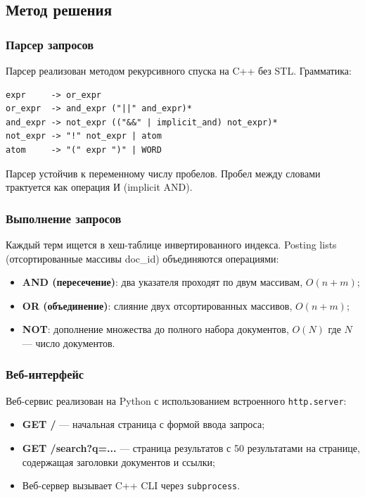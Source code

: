\documentclass[a4paper,12pt]{article}
\begin{document}
\subsection{Метод решения}

\subsubsection{Парсер запросов}

Парсер реализован методом рекурсивного спуска на C++ без STL. Грамматика:

\begin{lstlisting}
expr     -> or_expr
or_expr  -> and_expr ("||" and_expr)*
and_expr -> not_expr (("&&" | implicit_and) not_expr)*
not_expr -> "!" not_expr | atom
atom     -> "(" expr ")" | WORD
\end{lstlisting}

Парсер устойчив к переменному числу пробелов. Пробел между словами трактуется как 
операция И (implicit AND).

\subsubsection{Выполнение запросов}

Каждый терм ищется в хеш-таблице инвертированного индекса. Posting lists (отсортированные 
массивы doc\_id) объединяются операциями:
\begin{itemize}
    \item \textbf{AND (пересечение)}: два указателя проходят по двум массивам, $O(n + m)$;
    \item \textbf{OR (объединение)}: слияние двух отсортированных массивов, $O(n + m)$;
    \item \textbf{NOT}: дополнение множества до полного набора документов, $O(N)$ где $N$ --- 
    число документов.
\end{itemize}

\subsubsection{Веб-интерфейс}

Веб-сервис реализован на Python с использованием встроенного \texttt{http.server}:
\begin{itemize}
    \item \textbf{GET /} --- начальная страница с формой ввода запроса;
    \item \textbf{GET /search?q=...} --- страница результатов с 50 результатами на странице, 
    содержащая заголовки документов и ссылки;
    \item Веб-сервер вызывает C++ CLI через \texttt{subprocess}.
\end{itemize}
\end{document}
